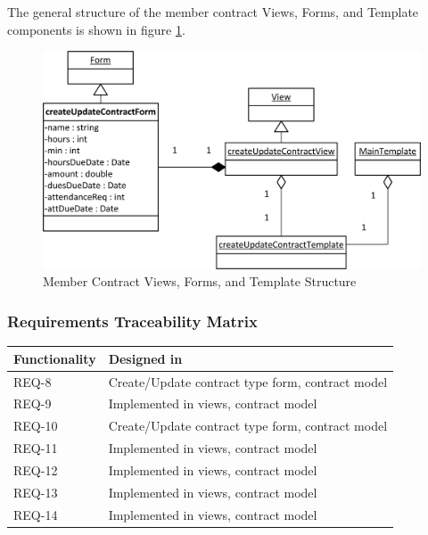 \documentclass{article}
\begin{document}
The general structure of the member contract Views, Forms, and Template components is shown in figure \ref{fig:memberContractViewFormTemplateDiagram}.

\FloatBarrier
\begin{figure}[h!]
\centering
\includegraphics[scale=.65]{img/viewFormTemplateDiagrams/createUpdateContract}
\caption{Member Contract Views, Forms, and Template Structure}
\label{fig:memberContractViewFormTemplateDiagram}
\end{figure}
\FloatBarrier

\subsubsection{Requirements Traceability Matrix}

\begin{table}
    \begin{tabular}{|l|l|}
        \hline
        Functionality & Designed in                                      \\ \hline
        REQ-8         & Create/Update contract type form, contract model \\ 
        REQ-9         & Implemented in views, contract model             \\ 
        REQ-10        & Create/Update contract type form, contract model \\ 
        REQ-11        & Implemented in views, contract model             \\ 
        REQ-12        & Implemented in views, contract model             \\ 
        REQ-13        & Implemented in views, contract model             \\ 
        REQ-14        & Implemented in views, contract model             \\
        \hline
    \end{tabular}
\end{table}
\end{document}
